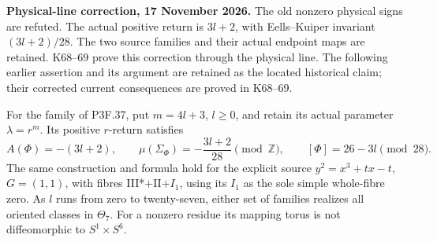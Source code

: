 \begin{theorem}\label{night:P3K.24}
\par\noindent\textbf{Physical-line correction, 17 November 2026.} The old nonzero physical signs are refuted. The actual positive return is \(3l+2\), with Eells--Kuiper invariant \((3l+2)/28\). The two source families and their actual endpoint maps are retained. K68--69 prove this correction through the physical line. The following earlier assertion and its argument are retained as the located historical claim; their corrected current consequences are proved in K68--69.\medskip\par 
For the family of P3F.37, put $m=4l+3$, $l\ge0$, and retain
its actual parameter $\lambda=r^m$. Its positive $r$-return
satisfies
\[
 A(\Phi)=-(3l+2),\qquad
 \mu(\Sigma_\Phi)=-\frac{3l+2}{28}\pmod{\mathbb Z},
 \qquad [\Phi]=26-3l\pmod{28}.                         \tag{K24.1}
\]
The same construction and formula hold for the explicit source
$y^2=x^3+tx-t$, $G=(1,1)$, with fibres III*$+$II$+I_1$,
using its $I_1$ as the sole simple whole-fibre zero. As $l$ runs
from zero to twenty-seven, either set of families realizes all
oriented classes in $\Theta_7$. For a nonzero residue its mapping
torus is not diffeomorphic to $S^1\times S^6$.
\end{theorem}
